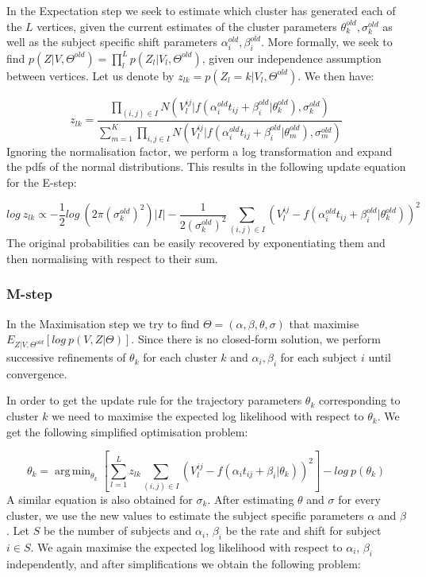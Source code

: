 \documentclass{llncs}
\DeclareMathOperator*{\argmin}{arg\,min}
\begin{document}
In the Expectation step we seek to estimate which cluster has generated each of the $L$ vertices, given the current estimates of the cluster parameters $\theta_k^{old}, \sigma_k^{old}$ as well as the subject specific shift parameters $\alpha_i^{old}, \beta_i^{old}$. More formally, we seek to find $p(Z|V,\Theta^{old}) = \prod_l^L p(Z_l|V_l,\Theta^{old})$, given our independence assumption between vertices. Let us denote by $z_{lk} = p(Z_l = k | V_l,\Theta^{old})$. We then have:

\begin{equation}
 z_{lk} =  \frac{\prod_{(i,j) \in I} N(V_l^{ij} | f(\alpha_i^{old} t_{ij} + \beta_i^{old} | \theta_k^{old}), \sigma_k^{old})}{\sum_{m=1}^K \prod_{i,j \in I} N(V_l^{ij} | f(\alpha_i^{old} t_{ij} + \beta_i^{old} | \theta_m^{old}), \sigma_m^{old})}
\end{equation}
Ignoring the normalisation factor, we perform a log transformation and expand the pdfs of the normal distributions. This results in the following update equation for the E-step:

\begin{equation}
 log\ z_{lk} \propto  -\frac{1}{2} log\ (2 \pi \left(\sigma_k^{old}\right)^2) |I| - \frac{1}{2\left(\sigma_k^{old}\right)^2} \sum_{(i,j) \in I} (V_l^{ij} - f(\alpha_i^{old} t_{ij} + \beta_i^{old} | \theta_k^{old}))^2 
\end{equation}
The original probabilities can be easily recovered by exponentiating them and then normalising with respect to their sum.

\subsubsection{M-step}

In the Maximisation step we try to find $\Theta = (\alpha, \beta, \theta, \sigma)$ that maximise $E_{Z|V,\Theta^{old}} [log\ p(V,Z|\Theta)]$. Since there is no closed-form solution, we perform successive refinements of $\theta_k$ for each cluster $k$ and $\alpha_i, \beta_i$ for each subject $i$ until convergence. 

In order to get the update rule for the trajectory parameters $\theta_k$ corresponding to cluster $k$ we need to maximise the expected log likelihood with respect to $\theta_k$. We get the following simplified optimisation problem:

\begin{equation}
 \label{eq:theta}
 \theta_k = \argmin_{\theta_k} \left[\sum_{l=1}^L z_{lk} \sum_{(i,j) \in I} (V_l^{ij} - f(\alpha_i t_{ij} + \beta_i | \theta_k))^2 \right] - log\ p(\theta_k) 
\end{equation}
A similar equation is also obtained for $\sigma_k$. After estimating $\theta$ and $\sigma$ for every cluster, we use the new values to estimate the subject specific parameters $\alpha$ and $\beta$. Let $S$ be the number of subjects and $\alpha_i$, $\beta_i$ be the rate and shift for subject $i \in S$. We again maximise the expected log likelihood with respect to $\alpha_i$, $\beta_i$ independently, and after simplifications we obtain the following problem:
\end{document}
